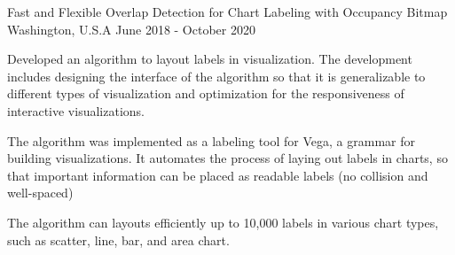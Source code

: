 

\begin{cvpubs}

  \cvpub
    {Fast and Flexible Overlap Detection for Chart Labeling with Occupancy Bitmap} %
    {Washington, U.S.A} %
    {June 2018 - October 2020} %
    {} %
    {} %
    {
      \begin{cvitems} %
        \item {
          Developed an algorithm to layout labels in visualization.
          The development includes designing the interface of the algorithm so that it is generalizable to different types of visualization and optimization for the responsiveness of interactive visualizations.
        }
        \item {
          The algorithm was implemented as a labeling tool for Vega, a grammar for building visualizations.
          It automates the process of laying out labels in charts, so that important information can be placed as readable labels (no collision and well-spaced)
        }
        \item {
          The algorithm can layouts efficiently up to 10,000 labels in various chart types, such as scatter, line, bar, and area chart.
        }
      \end{cvitems}
    }
\end{cvpubs}
